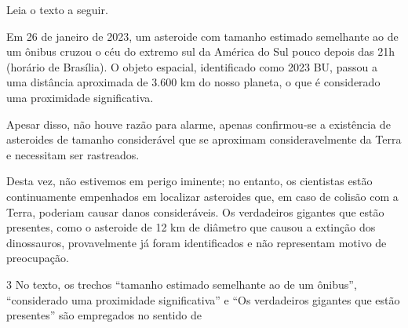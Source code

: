 
\pagebreak
Leia o texto a seguir.

\begin{myquote}
Em 26 de janeiro de 2023, um asteroide com tamanho estimado semelhante
ao de um ônibus cruzou o céu do extremo sul da América do Sul pouco
depois das 21h (horário de Brasília). O objeto espacial, identificado
como 2023 BU, passou a uma distância aproximada de 3.600 km do nosso
planeta, o que é considerado uma proximidade significativa.

Apesar disso, não houve razão para alarme, apenas confirmou-se a
existência de asteroides de tamanho considerável que se aproximam
consideravelmente da Terra e necessitam ser rastreados.

Desta vez, não estivemos em perigo iminente; no entanto, os cientistas
estão continuamente empenhados em localizar asteroides que, em caso de
colisão com a Terra, poderiam causar danos consideráveis. Os verdadeiros
gigantes que estão presentes, como o asteroide de 12 km de diâmetro que
causou a extinção dos dinossauros, provavelmente já foram identificados
e não representam motivo de preocupação.

\end{myquote}

\num{3} No texto, os trechos ``tamanho estimado semelhante ao de um ônibus'',
``considerado uma proximidade significativa'' e ``Os verdadeiros
gigantes que estão presentes'' são empregados no sentido de

